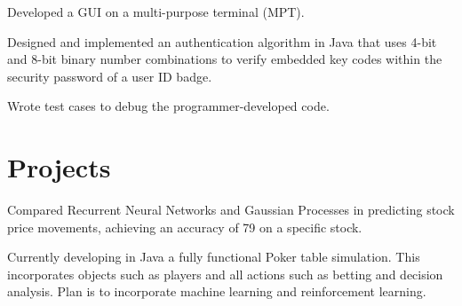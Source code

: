 \documentclass[]{deedy-resume-openfont}
\begin{document}
\begin{minipage}[t]{0.61\textwidth}
{}
\begin{tightemize} 
\item Developed a GUI on a multi-purpose terminal (MPT).
\item Designed and implemented an authentication algorithm in Java that uses 4-bit and 8-bit binary number combinations to verify embedded key codes within the security password of a user ID badge.
\item Wrote test cases to debug the programmer-developed code. 
\end{tightemize}
\sectionsep

\iffalse
\item Developed a GUI for technicians running a multi-purpose terminal (MPT).
\item Designed and implemented an authentication algorithm in Java that uses 4-bit and 8-bit binary number combinations to verify embedded key codes within the security password of a user ID badge.
\item Wrote test cases to debug the programmer-developed code. 
\item Drafted the user documentation that accompanied the GUI.
\fi

\section{Projects}
\begin{tightemize} 
\item Compared Recurrent Neural Networks and Gaussian Processes in predicting stock price movements, achieving an accuracy of 79 on a specific stock.
\item Currently developing in Java a fully functional Poker table simulation. This incorporates objects such as players and all actions such as betting and decision analysis. Plan is to incorporate machine learning and reinforcement learning.
\end{tightemize} 

\end{minipage} 
\end{document}
